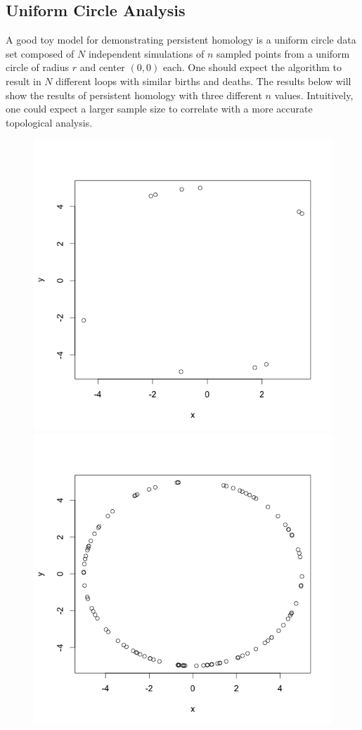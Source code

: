 \documentclass[12pt]{article}
\begin{document}
\subsection{Uniform Circle Analysis}
A good toy model for demonstrating persistent homology is a uniform circle data set composed of $N$ independent simulations of $n$ sampled points from a uniform circle of radius $r$ and center $(0,0)$ each. One should expect the algorithm to result in $N$ different loops with similar births and deaths. The results below will show the results of persistent homology with three different $n$ values. Intuitively, one could expect a larger sample size to correlate with a more accurate topological analysis. 

\begin{figure}[!htb]
    \includegraphics[width=0.85\linewidth]{circle10.png}
  \endminipage\hfill
    \includegraphics[width=0.85\linewidth]{circle100.png}

\end{figure}
\end{document}
